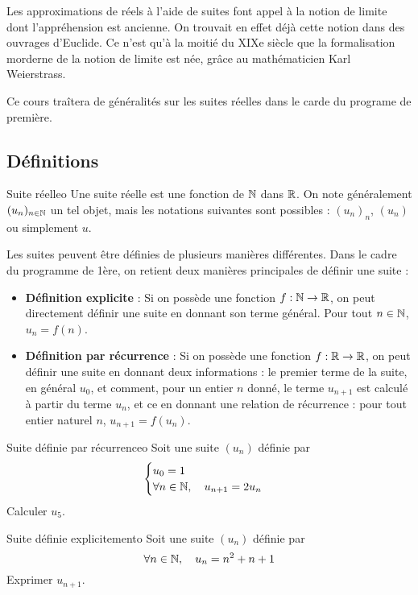 Les approximations de réels à l'aide de suites font appel à la notion de limite dont l'appréhension est ancienne. On trouvait en effet déjà cette notion dans des ouvrages d'Euclide. Ce n'est qu'à la moitié du XIXe siècle que la formalisation morderne de la notion de limite est née, grâce au mathématicien Karl Weierstrass.


Ce cours traîtera de généralités sur les suites réelles dans le carde du programe de première.

\subsection{Définitions}

\begin{definition}{Suite réelle}{o}
Une suite réelle est une fonction de $\mathbb{N}$ dans $\mathbb{R}$. On note généralement $(u_n)_{n\in\mathbb{N}}$ un tel objet, mais les notations suivantes sont possibles : $(u_n)_n$, $(u_n)$ ou simplement $u$.
\end{definition}

Les suites peuvent être définies de plusieurs manières différentes. Dans le cadre du programme de 1ère, on retient deux manières principales de définir une suite : 
\begin{itemize}
	\item \textbf{Définition explicite} : Si on possède une fonction $f:\mathbb{N}\to\mathbb{R}$, on peut directement définir une suite en donnant son terme général. Pour tout $n\in\mathbb{N}$, $u_n=f(n)$.
	\item \textbf{Définition par récurrence} : Si on possède une fonction $f:\mathbb{R}\to\mathbb{R}$, on peut définir une suite en donnant deux informations : le premier terme de la suite, en général $u_0$, et comment, pour un entier $n$ donné, le terme $u_{n+1}$ est calculé à partir du terme $u_n$, et ce en donnant une relation de récurrence : pour tout entier naturel $n$, $u_{n+1}=f(u_n)$.
\end{itemize}

\begin{exemple}{Suite définie par récurrence}{o}
Soit une suite $(u_n)$ définie par \[\begin{cases}u_0=1\\ \forall n\in\mathbb{N},\quad u_{n+1}=2u_n\end{cases}\]
Calculer $u_5$.
\end{exemple}

\begin{exemple}{Suite définie explicitement}{o}
Soit une suite $(u_n)$ définie par \[\forall n\in\mathbb{N},\quad u_n=n^2+n+1\]
Exprimer $u_{n+1}$.
\end{exemple}

